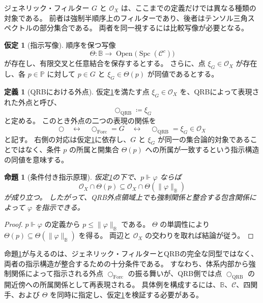 \documentclass[11pt]{ltjsarticle}
\theoremstyle{plain}
\newtheorem{proposition}[theorem]{命題}
\theoremstyle{definition}
\newtheorem{definition}[theorem]{定義}
\newtheorem{assumption}[theorem]{仮定}
\newcommand{\Spc}{\operatorname{Spc}}
\newcommand{\dfix}{\bigcirc}
\begin{document}
ジェネリック・フィルター \(G\) と \(\mathcal{O}_X\) は、ここまでの定義だけでは異なる種類の対象である。
前者は強制半順序上のフィルターであり、後者はテンソル三角スペクトルの部分集合である。
両者を同一視するには比較写像が必要となる。

\begin{assumption}[指示写像]\label{ass:designation}
順序を保つ写像
\[
\Theta\colon\mathbb{B}\longrightarrow
\operatorname{Open}\!\bigl(\Spc(\mathcal{C}^c)\bigr)
\]
が存在し、有限交叉と任意結合を保存するとする。
さらに、点 \(\xi_G\in\mathcal O_X\) が存在し、各 \(p\in\mathbb P\) に対して
\(p\in G\) と \(\xi_G\in\Theta(p)\) が同値であるとする。
\end{assumption}

\begin{definition}[QRBにおける外点]\label{def:qrb-outer-point}
仮定\ref{ass:designation}を満たす点 \(\xi_G\in\mathcal O_X\) を、QRBによって表現された外点と呼び、
\[
\dfix_{\mathrm{QRB}}\coloneqq\xi_G
\]
と定める。
このとき外点の二つの表現の関係を
\[
\dfix
\quad\longleftrightarrow\quad
\dfix_{\mathrm{Forc}}=G
\quad\longleftrightarrow\quad
\dfix_{\mathrm{QRB}}=\xi_G\in\mathcal O_X
\]
と記す。
右側の対応は仮定\ref{ass:designation}に依存し、\(G\) と \(\xi_G\) が同一の集合論的対象であることではなく、条件 \(p\) の所属と開集合 \(\Theta(p)\) への所属が一致するという指示構造の同値を意味する。
\end{definition}

\begin{proposition}[条件付き指示原理]\label{prop:designation}
仮定\ref{ass:designation}の下で、\(p\Vdash\varphi\) ならば
\[
\mathcal{O}_X\cap\Theta(p)
\subseteq
\mathcal{O}_X\cap\Theta\!\left(\lVert\varphi\rVert_{\mathbb B}\right)
\]
が成り立つ。
したがって、QRB外点領域上でも強制関係と整合する包含関係によって \(\varphi\) を指示できる。
\end{proposition}

\begin{proof}
\(p\Vdash\varphi\) の定義から \(p\leq\lVert\varphi\rVert_{\mathbb B}\) である。
\(\Theta\) の単調性により
\(\Theta(p)\subseteq\Theta(\lVert\varphi\rVert_{\mathbb B})\) を得る。
両辺と \(\mathcal{O}_X\) の交わりを取れば結論が従う。
\end{proof}

命題\ref{prop:designation}が与えるのは、ジェネリック・フィルターとQRBの完全な同型ではなく、両者の指示構造が整合するための十分条件である。
すなわち、体系内部から強制関係によって指示される外点 \(\dfix_{\mathrm{Forc}}\) の振る舞いが、QRB側では点 \(\dfix_{\mathrm{QRB}}\) の開近傍への所属関係として再表現される。
具体例を構成するには、\(\mathbb B\)、\(\mathcal C\)、四関手、および \(\Theta\) を同時に指定し、仮定\ref{ass:designation}を検証する必要がある。
\end{document}
